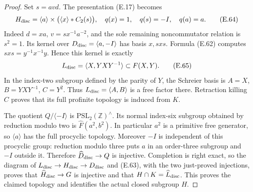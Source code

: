 \begin{proof}
Set $s=avd$.  The presentation (E.17) becomes
\[
 H_{\rm disc}=\langle a\rangle\times
       \bigl(\langle x\rangle*C_2(s)\bigr),
 \quad q(x)=1,\quad q(s)=-I,\quad q(a)=a.                 \tag{E.64}
\]
Indeed $d=xa$, $v=sx^{-1}a^{-2}$, and the sole
remaining noncommutator relation is $s^2=1$.
Its kernel over $D_{\rm disc}=\langle a,-I\rangle$
has basis $x,sxs$.  Formula (E.62) computes
$sxs=y^{-1}x^{-1}y$.  Hence this kernel is exactly
\[
 L_{\rm disc}=\langle X,YXY^{-1}\rangle
                   \subset F(X,Y).                     \tag{E.65}
\]
In the index-two subgroup defined by the parity of
$Y$, the Schreier basis is
$A=X$, $B=YXY^{-1}$, $C=Y^2$.
Thus $L_{\rm disc}=\langle A,B\rangle$ is a free
factor there.  Retraction killing $C$ proves that
its full profinite topology is induced from $K$.

The quotient $Q/\langle-I\rangle$ is
$\mathrm{PSL}_2(\mathbb Z)^{\wedge}$.
Its normal index-six subgroup obtained by reduction
modulo two is $\widehat F(a^2,b^2)$.  In particular
$a^2$ is a primitive free generator, so
$\langle a\rangle$ has the full procyclic topology.
Moreover $-I$ is independent of this procyclic
group: reduction modulo three puts $a$ in an
order-three subgroup and $-I$ outside it.  Therefore
$\widehat D_{\rm disc}\to Q$ is injective.
Completion is right exact, so the diagram of
$L_{\rm disc}\to H_{\rm disc}\to D_{\rm disc}$
and (E.63), with the two just-proved injections,
proves that $\widehat H_{\rm disc}\to G$ is
injective and that $H\cap K=\widehat L_{\rm disc}$.
This proves the claimed topology and identifies
the actual closed subgroup $H$.


\end{proof}
